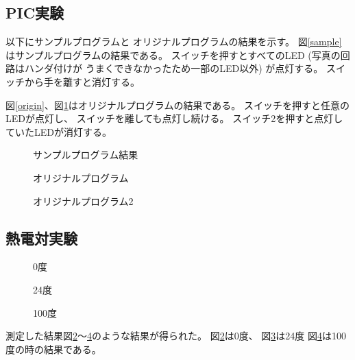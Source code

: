 \documentclass{jsarticle}
\begin{document}
\subsection{PIC実験}
以下にサンプルプログラムと
オリジナルプログラムの結果を示す。
図\ref{sample}はサンプルプログラムの結果である。
スイッチを押すとすべてのLED
(写真の回路はハンダ付けが
うまくできなかったため一部のLED以外)
が点灯する。
スイッチから手を離すと消灯する。\par

図\ref{origin}、図\ref{origin2}はオリジナルプログラムの結果である。
スイッチを押すと任意のLEDが点灯し、
スイッチを離しても点灯し続ける。
スイッチ2を押すと点灯していたLEDが消灯する。


\begin{figure}[hbtp]
 \begin{minipage}{0.3\hsize}
 \begin{center}
		\caption{サンプルプログラム結果}
		\label{sample}
 \end{center}
 \end{minipage}
 \begin{minipage}{0.3\hsize}
 \begin{center}
		 \caption{オリジナルプログラム}
 \label{origin}
 \end{center}
 \end{minipage}
 \begin{minipage}{0.3\hsize}
 \begin{center}
		 \caption{オリジナルプログラム2}
 \label{origin2}
 \end{center}
 \end{minipage}
\end{figure}

\subsection{熱電対実験}
\begin{figure}[Htbp]
		\centering
		\caption{0度}
		\label{fir}
\end{figure}
\begin{figure}[Htbp]
		\centering
		\caption{24度}
		\label{sec}
\end{figure}
\begin{figure}[Htbp]
		\centering
		\caption{100度}
		\label{thr}
\end{figure}
測定した結果図\ref{fir}〜\ref{thr}のような結果が得られた。
図\ref{fir}は0度、
図\ref{sec}は24度
図\ref{thr}は100度の時の結果である。
\end{document}
